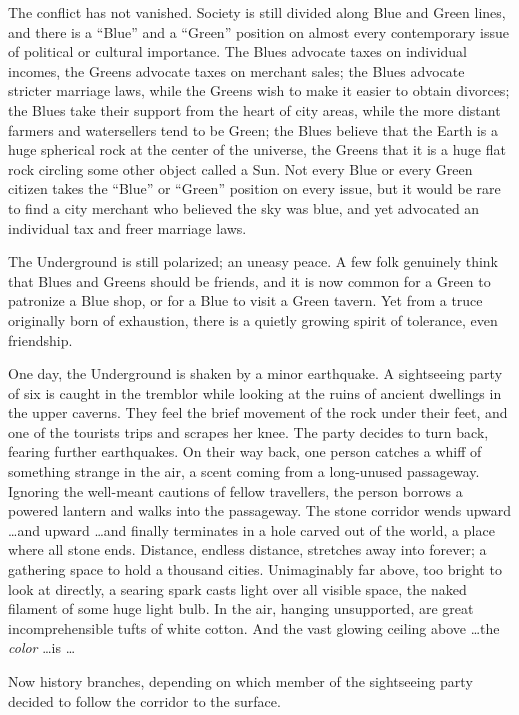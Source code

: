{
 The conflict has not vanished. Society is still divided along Blue
and Green lines, and there is a
``Blue'' and a
``Green'' position on almost every
contemporary issue of political or cultural importance. The Blues
advocate taxes on individual incomes, the Greens advocate taxes on
merchant sales; the Blues advocate stricter marriage laws, while the
Greens wish to make it easier to obtain divorces; the Blues take their
support from the heart of city areas, while the more distant farmers
and watersellers tend to be Green; the Blues believe that the Earth is
a huge spherical rock at the center of the universe, the Greens that it
is a huge flat rock circling some other object called a Sun. Not every
Blue or every Green citizen takes the
``Blue'' or
``Green'' position on every issue,
but it would be rare to find a city merchant who believed the sky was
blue, and yet advocated an individual tax and freer marriage laws.}

{
 The Underground is still polarized; an uneasy peace. A few folk
genuinely think that Blues and Greens should be friends, and it is now
common for a Green to patronize a Blue shop, or for a Blue to visit a
Green tavern. Yet from a truce originally born of exhaustion, there is
a quietly growing spirit of tolerance, even friendship.}

{
 One day, the Underground is shaken by a minor earthquake. A
sightseeing party of six is caught in the tremblor while looking at the
ruins of ancient dwellings in the upper caverns. They feel the brief
movement of the rock under their feet, and one of the tourists trips
and scrapes her knee. The party decides to turn back, fearing further
earthquakes. On their way back, one person catches a whiff of something
strange in the air, a scent coming from a long-unused passageway.
Ignoring the well-meant cautions of fellow travellers, the person
borrows a powered lantern and walks into the passageway. The stone
corridor wends upward \ldots and upward \ldots and finally terminates in
a hole carved out of the world, a place where all stone ends. Distance,
endless distance, stretches away into forever; a gathering space to
hold a thousand cities. Unimaginably far above, too bright to look at
directly, a searing spark casts light over all visible space, the naked
filament of some huge light bulb. In the air, hanging unsupported, are
great incomprehensible tufts of white cotton. And the vast glowing
ceiling above \ldots the \textit{color} \ldots is \ldots}

{
 Now history branches, depending on which member of the sightseeing
party decided to follow the corridor to the surface.}

